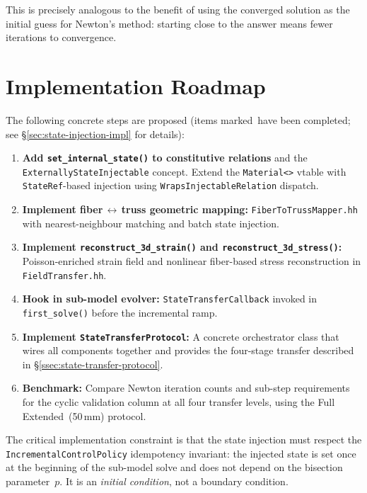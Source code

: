 This is precisely analogous to the benefit of using the converged
solution as the initial guess for Newton's method: starting close to
the answer means fewer iterations to convergence.

\section{Implementation Roadmap}
\label{sec:impl-roadmap}

The following concrete steps are proposed (items marked~\checkmark have
been completed; see \S\ref{sec:state-injection-impl} for details):

\begin{enumerate}
  \item[\checkmark] \textbf{Add \texttt{set\_internal\_state()} to
    constitutive relations} and the \texttt{ExternallyStateInjectable}
    concept.  Extend the \texttt{Material<>} vtable with
    \texttt{StateRef}-based injection using
    \texttt{WrapsInjectableRelation} dispatch.
  \item[\checkmark] \textbf{Implement fiber$\,\leftrightarrow\,$truss
    geometric mapping:}  \texttt{FiberToTrussMapper.hh} with
    nearest-neighbour matching and batch state injection.
  \item[\checkmark] \textbf{Implement
    \texttt{reconstruct\_3d\_strain()} and
    \texttt{reconstruct\_3d\_stress()}:}  Poisson-enriched strain
    field and nonlinear fiber-based stress reconstruction in
    \texttt{FieldTransfer.hh}.
  \item[\checkmark] \textbf{Hook in sub-model evolver:}
    \texttt{StateTransferCallback} invoked in \texttt{first\_solve()}
    before the incremental ramp.
  \item \textbf{Implement \texttt{StateTransferProtocol}:}  A
    concrete orchestrator class that wires all components together
    and provides the four-stage transfer described in
    \S\ref{ssec:state-transfer-protocol}.
  \item \textbf{Benchmark:}  Compare Newton iteration counts and
    sub-step requirements for the cyclic validation column at
    all four transfer levels, using the Full Extended~(50\,mm)
    protocol.
\end{enumerate}

The critical implementation constraint is that the state injection
must respect the \texttt{IncrementalControlPolicy} idempotency
invariant: the injected state is set once at the beginning of the
sub-model solve and does not depend on the bisection parameter~$p$.
It is an \emph{initial condition}, not a boundary condition.



